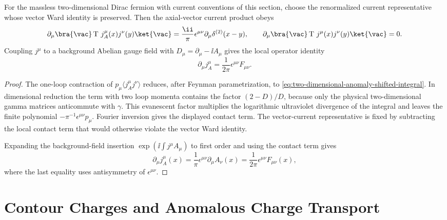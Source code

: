 \begin{proposition}
\label{prop:two-dimensional-axial-contact-term}
For the massless two-dimensional Dirac fermion with current conventions of
this section, choose the renormalized current representative whose vector
Ward identity is preserved.  Then the axial-vector current product obeys
\[
  \partial_\mu
  \bra{\vac}
  \operatorname T\,j_A^\mu(x)j^\nu(y)
  \ket{\vac}
  =
  \frac{\ii}{\pi}\epsilon^{\mu\nu}
  \partial_\mu\delta^{(2)}(x-y),
  \qquad
  \partial_\mu
  \bra{\vac}
  \operatorname T\,j^\mu(x)j^\nu(y)
  \ket{\vac}
  =
  0 .
\]
Coupling \(j^\mu\) to a background Abelian gauge field with
\(D_\mu=\partial_\mu-\ii A_\mu\) gives the local operator identity
\[
  \partial_\mu j_A^\mu
  =
  \frac1{2\pi}\epsilon^{\mu\nu}F_{\mu\nu}.
\]
\end{proposition}

\begin{proof}
The one-loop contraction of
\(p_\mu\langle j_A^\mu j^\nu\rangle\) reduces, after Feynman
parametrization, to
\eqref{eq:two-dimensional-anomaly-shifted-integral}.  In dimensional
reduction the term with two loop momenta contains the factor
\((2-D)/D\), because only the physical two-dimensional gamma matrices
anticommute with \(\gamma\).  This evanescent factor multiplies the logarithmic
ultraviolet divergence of the integral and leaves the finite polynomial
\(-\pi^{-1}\epsilon^{\mu\nu}p_\mu\).  Fourier inversion gives the displayed
contact term.  The vector-current representative is fixed by subtracting the
local contact term that would otherwise violate the vector Ward identity.

Expanding the background-field insertion
\(\exp(\ii\int j^\mu A_\mu)\) to first order and using the contact term gives
\[
  \partial_\mu j_A^\mu(x)
  =
  \frac1{\pi}\epsilon^{\mu\nu}\partial_\mu A_\nu(x)
  =
  \frac1{2\pi}\epsilon^{\mu\nu}F_{\mu\nu}(x),
\]
where the last equality uses antisymmetry of \(\epsilon^{\mu\nu}\).
\end{proof}

\section{Contour Charges and Anomalous Charge Transport}

